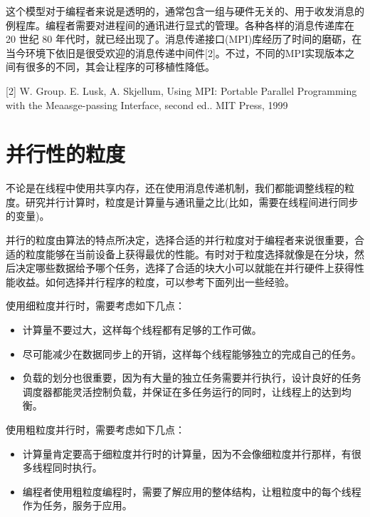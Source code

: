 这个模型对于编程者来说是透明的，通常包含一组与硬件无关的、用于收发消息的例程库。编程者需要对进程间的通讯进行显式的管理。各种各样的消息传递库在 20 世纪 80 年代时，就已经出现了。消息传递接口(MPI)库经历了时间的磨砺，在当今环境下依旧是很受欢迎的消息传递中间件[2]。不过，不同的MPI实现版本之间有很多的不同，其会让程序的可移植性降低。

\myRefRule

\begin{myRefs}

[2] W. Group. E. Lusk, A. Skjellum, Using MPI: Portable Parallel Programming with the Meaasge-passing Interface, second ed.. MIT Press, 1999

\end{myRefs}



\section{并行性的粒度}

不论是在线程中使用共享内存，还在使用消息传递机制，我们都能调整线程的粒度。研究并行计算时，粒度是计算量与通讯量之比(比如，需要在线程间进行同步的变量)。

并行的粒度由算法的特点所决定，选择合适的并行粒度对于编程者来说很重要，合适的粒度能够在当前设备上获得最优的性能。有时对于粒度选择就像是在分块，然后决定哪些数据给予哪个任务，选择了合适的块大小可以就能在并行硬件上获得性能收益。如何选择并行程序的粒度，可以参考下面列出一些经验。

使用细粒度并行时，需要考虑如下几点：

\begin{itemize}
\item 计算量不要过大，这样每个线程都有足够的工作可做。
\item 尽可能减少在数据同步上的开销，这样每个线程能够独立的完成自己的任务。
\item 负载的划分也很重要，因为有大量的独立任务需要并行执行，设计良好的任务调度器都能灵活控制负载，并保证在多任务运行的同时，让线程上的达到均衡。
\end{itemize}

使用粗粒度并行时，需要考虑如下几点：

\begin{itemize}
\item 计算量肯定要高于细粒度并行时的计算量，因为不会像细粒度并行那样，有很多线程同时执行。
\item 编程者使用粗粒度编程时，需要了解应用的整体结构，让粗粒度中的每个线程作为任务，服务于应用。
\end{itemize}

